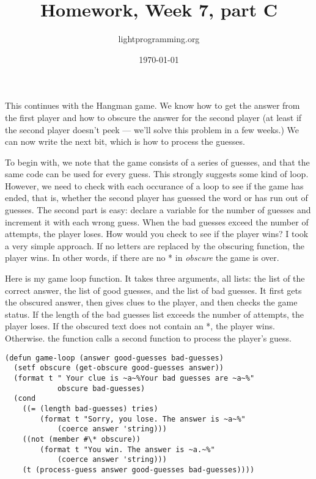 \documentclass{article}
\title{Homework, Week 7, part C}
\author{lightprogramming.org}
\date{\today}
\begin{document}
\maketitle{}
\lstset{language=Lisp,numbers=left,keepspaces=false,basicstyle=\small,numberstyle=\tiny,breaklines=true,showstringspaces=false}

This continues with the Hangman game. We know how to get the answer from the first player and how to obscure the answer for the second player (at least if the second player doesn't peek --- we'll solve this problem in a few weeks.) We can now write the next bit, which is how to process the guesses.

To begin with, we note that the game consists of a series of guesses, and that the same code can be used for every guess. This strongly suggests some kind of loop. However, we need to check with each occurance of a loop to see if the game has ended, that is, whether the second player has guessed the word or has run out of guesses. The second part is easy: declare a variable for the number of guesses and increment it with each wrong guess. When the bad guesses exceed the number of attempts, the player loses. How would you check to see if the player wins? I took a very simple approach. If no letters are replaced by the obscuring function, the player wins. In other words, if there are no * in \textit{obscure} the game is over. 

Here is my game loop function. It takes three arguments, all lists: the list of the correct answer, the list of good guesses, and the list of bad guesses. It first gets the obscured answer, then gives clues to the player, and then checks the game status. If the length of the bad guesses list exceeds the number of attempts, the player loses. If the obscured text does not contain an *, the player wins. Otherwise. the function calls a second function to process the player's guess.

\begin{lstlisting}
(defun game-loop (answer good-guesses bad-guesses)
  (setf obscure (get-obscure good-guesses answer))
  (format t " Your clue is ~a~%Your bad guesses are ~a~%" 
            obscure bad-guesses)
  (cond
    ((= (length bad-guesses) tries) 
        (format t "Sorry, you lose. The answer is ~a~%" 
            (coerce answer 'string)))
    ((not (member #\* obscure)) 
        (format t "You win. The answer is ~a.~%" 
            (coerce answer 'string)))
    (t (process-guess answer good-guesses bad-guesses))))
\end{lstlisting}
\end{document}
